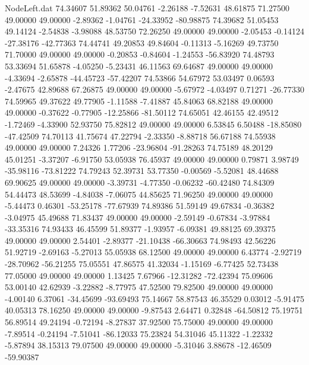 \begin{filecontents}{NodeLeft.dat}
  74.34607   51.89362   50.04761    -2.26188   -7.52631   48.61875   71.27500   49.00000   49.00000   -2.89362   -1.04761  -24.33952  -80.98875
  74.39682   51.05453   49.14124    -2.54838   -3.98088   48.53750   72.26250   49.00000   49.00000   -2.05453   -0.14124  -27.38176  -42.77363
  74.44741   49.20853   49.84604    -0.11313   -5.16269   49.73750   71.70000   49.00000   49.00000   -0.20853   -0.84604   -1.24553  -56.83920
  74.48793   53.33694   51.65878    -4.05250   -5.23431   46.11563   69.64687   49.00000   49.00000   -4.33694   -2.65878  -44.45723  -57.42207
  74.53866   54.67972   53.03497     0.06593   -2.47675   42.89688   67.26875   49.00000   49.00000   -5.67972   -4.03497    0.71271  -26.77330
  74.59965   49.37622   49.77905    -1.11588   -7.41887   45.84063   68.82188   49.00000   49.00000   -0.37622   -0.77905  -12.25866  -81.50112
  74.65051   42.46155   42.49512    -1.72469   -4.33900   52.93750   75.82812   49.00000   49.00000    6.53845    6.50488  -18.85080  -47.42509
  74.70113   41.75674   47.22794    -2.33350   -8.88718   56.67188   74.55938   49.00000   49.00000    7.24326    1.77206  -23.96804  -91.28263
  74.75189   48.20129   45.01251    -3.37207   -6.91750   53.05938   76.45937   49.00000   49.00000    0.79871    3.98749  -35.98116  -73.81222
  74.79243   52.39731   53.77350    -0.00569   -5.52081   48.44688   69.90625   49.00000   49.00000   -3.39731   -4.77350   -0.06232  -60.42480
  74.84309   54.44473   48.53699    -4.84038   -7.06075   44.85625   71.96250   49.00000   49.00000   -5.44473    0.46301  -53.25178  -77.67939
  74.89386   51.59149   49.67834    -0.36382   -3.04975   45.49688   71.83437   49.00000   49.00000   -2.59149   -0.67834   -3.97884  -33.35316
  74.93433   46.45599   51.89377    -1.93957   -6.09381   49.88125   69.39375   49.00000   49.00000    2.54401   -2.89377  -21.10438  -66.30663
  74.98493   42.56226   51.92719    -2.69163   -5.27013   55.05938   68.12500   49.00000   49.00000    6.43774   -2.92719  -28.70962  -56.21255
  75.05551   47.86575   41.32034    -1.15169   -6.77425   52.73438   77.05000   49.00000   49.00000    1.13425    7.67966  -12.31282  -72.42394
  75.09606   53.00140   42.62939    -3.22882   -8.77975   47.52500   79.82500   49.00000   49.00000   -4.00140    6.37061  -34.45699  -93.69493
  75.14667   58.87543   46.35529     0.03012   -5.91475   40.05313   78.16250   49.00000   49.00000   -9.87543    2.64471    0.32848  -64.50812
  75.19751   56.89514   49.24194    -0.72194   -8.27837   37.92500   75.75000   49.00000   49.00000   -7.89514   -0.24194   -7.51041  -86.12033
  75.23824   54.31046   45.11322    -1.22332   -5.87894   38.15313   79.07500   49.00000   49.00000   -5.31046    3.88678  -12.46509  -59.90387

\end{filecontents}

